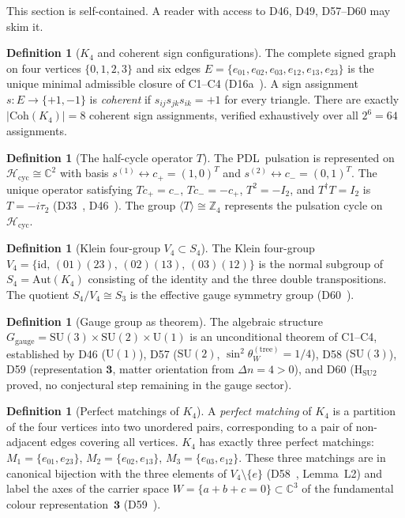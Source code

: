 \documentclass[11pt,a4paper]{article}
\theoremstyle{plain}
\theoremstyle{definition}
\newtheorem{definition}[theorem]{Definition}
\theoremstyle{remark}
\newcommand{\PDL}{\textsc{PDL}}
\newcommand{\Kfour}{K_4}
\newcommand{\Vfour}{V_4}
\newcommand{\Sfour}{S_4}
\newcommand{\Sthree}{S_3}
\newcommand{\Uone}{\mathrm{U}(1)}
\newcommand{\SUtwo}{\mathrm{SU}(2)}
\newcommand{\SUthree}{\mathrm{SU}(3)}
\newcommand{\Ggauge}{G_{\mathrm{gauge}}}
\newcommand{\Coh}{\mathrm{Coh}(K_4)}
\newcommand{\Hcyc}{\mathcal{H}_{\mathrm{cyc}}}
\newcommand{\cplu}{c_+}
\newcommand{\cmin}{c_-}
\begin{document}
This section is self-contained. A reader with access to D46, D49, D57--D60 may skim it.

\begin{definition}[$\Kfour$ and coherent sign configurations]
The complete signed graph on four vertices $\{0,1,2,3\}$ and six edges
$E = \{e_{01}, e_{02}, e_{03}, e_{12}, e_{13}, e_{23}\}$ is the unique minimal
admissible closure of C1--C4 (D16a~\cite{PDL_D16a}). A sign assignment
$s : E \to \{+1,-1\}$ is \emph{coherent} if $s_{ij} s_{jk} s_{ik} = +1$ for every
triangle. There are exactly $|\Coh| = 8$ coherent sign assignments, verified
exhaustively over all $2^6 = 64$ assignments.
\end{definition}

\begin{definition}[The half-cycle operator $T$]
The \PDL\ pulsation is represented on $\Hcyc \cong \mathbb{C}^2$ with basis
$s^{(1)} \leftrightarrow \cplu = (1,0)^T$ and $s^{(2)} \leftrightarrow \cmin = (0,1)^T$.
The unique operator satisfying $T\cplu = \cmin$, $T\cmin = -\cplu$, $T^2 = -I_2$,
and $T^\dagger T = I_2$ is $T = -i\tau_2$ (D33~\cite{PDL_D33}, D46~\cite{PDL_D46}).
The group $\langle T \rangle \cong \mathbb{Z}_4$ represents the pulsation cycle on
$\Hcyc$.
\end{definition}

\begin{definition}[Klein four-group $\Vfour \subset \Sfour$]
The Klein four-group $\Vfour = \{\mathrm{id},\,(01)(23),\,(02)(13),\,(03)(12)\}$ is
the normal subgroup of $\Sfour = \mathrm{Aut}(\Kfour)$ consisting of the identity and
the three double transpositions. The quotient $\Sfour/\Vfour \cong \Sthree$ is the
effective gauge symmetry group (D60~\cite{PDL_D60}).
\end{definition}

\begin{definition}[Gauge group as theorem]
The algebraic structure $\Ggauge = \SUthree \times \SUtwo \times \Uone$ is an
unconditional theorem of C1--C4, established by D46 ($\Uone$), D57 ($\SUtwo$,
$\sin^2\theta_W^{(\mathrm{tree})} = 1/4$), D58 ($\SUthree$), D59 (representation
$\mathbf{3}$, matter orientation from $\Delta n = 4 > 0$), and D60 ($\mathrm{H_{SU2}}$
proved, no conjectural step remaining in the gauge sector).
\end{definition}

\begin{definition}[Perfect matchings of $\Kfour$]
A \emph{perfect matching} of $\Kfour$ is a partition of the four vertices into two
unordered pairs, corresponding to a pair of non-adjacent edges covering all vertices.
$\Kfour$ has exactly three perfect matchings:
$M_1 = \{e_{01}, e_{23}\}$, $M_2 = \{e_{02}, e_{13}\}$, $M_3 = \{e_{03}, e_{12}\}$.
These three matchings are in canonical bijection with the three elements of
$\Vfour \setminus \{e\}$ (D58~\cite{PDL_D58}, Lemma~L2) and label the axes of the
carrier space $W = \{a+b+c=0\} \subset \mathbb{C}^3$ of the fundamental colour
representation~$\mathbf{3}$ (D59~\cite{PDL_D59}).
\end{definition}
\end{document}

